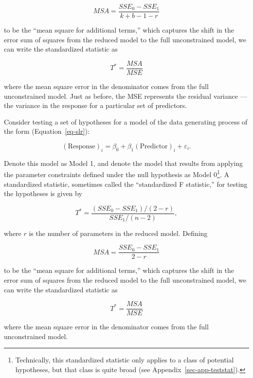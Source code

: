 \documentclass[
  letterpaper,
  DIV=11,
  numbers=noendperiod]{scrreprt}
\providecommand{\tightlist}{%
  \setlength{\itemsep}{0pt}\setlength{\parskip}{0pt}}\usepackage{longtable,booktabs,array}
\theoremstyle{definition}
\theoremstyle{definition}
\theoremstyle{plain}
\theoremstyle{remark}
\begin{document}
\[MSA = \frac{SSE_0 - SSE_1}{k + b - 1 - r}\]

to be the ``mean square for additional terms,'' which captures the shift
in the error sum of squares from the reduced model to the full
unconstrained model, we can write the standardized statistic as

\[T^* = \frac{MSA}{MSE}\]

where the mean square error in the denominator comes from the full
unconstrained model. Just as before, the MSE represents the residual
variance --- the variance in the response for a particular set of
predictors.

\begin{description}
\tightlist
\item[Standardized Statistic for Simple Linear Regression
(Definition~\ref{def-standard-f})]
Consider testing a set of hypotheses for a model of the data generating
process of the form (Equation~\ref{eq-slr}):
\end{description}

\[(\text{Response})_i = \beta_0 + \beta_1(\text{Predictor})_i + \varepsilon_i.\]

Denote this model as Model 1, and denote the model that results from
applying the parameter constraints defined under the null hypothesis as
Model 0\footnote{Technically, this standardized statistic only applies
  to a class of potential hypotheses, but that class is quite broad (see
  Appendix~\ref{sec-app-teststat}).}. A standardized statistic,
sometimes called the ``standardized F statistic,'' for testing the
hypotheses is given by

\[T^* = \frac{\left(SSE_0 - SSE_1\right) / (2 - r)}{SSE_1 / (n - 2)},\]

where \(r\) is the number of parameters in the reduced model. Defining

\[MSA = \frac{SSE_0 - SSE_1}{2 - r}\]

to be the ``mean square for additional terms,'' which captures the shift
in the error sum of squares from the reduced model to the full
unconstrained model, we can write the standardized statistic as

\[T^* = \frac{MSA}{MSE}\]

where the mean square error in the denominator comes from the full
unconstrained model.
\end{document}
